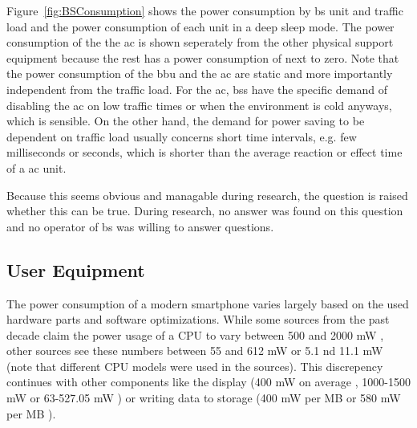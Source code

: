 \documentclass[11pt,a4paper]{article}
\begin{document}
Figure~\ref{fig:BSConsumption} shows the power consumption by \acrshort{bs} unit and traffic load and the power consumption of each unit in a deep sleep mode.
The power consumption of the the \acrshort{ac} is shown seperately from the other physical support equipment because the rest has a power consumption of next to zero.  
Note that the power consumption of the \acrshort*{bbu} and the \acrshort{ac} are static and more importantly independent from the traffic load.
For the \acrlong{ac}, \acrlong{bs}s have the specific demand of disabling the \acrshort{ac} on low traffic times or when the environment is cold anyways, which is sensible.
On the other hand, the demand for power saving to be dependent on traffic load usually concerns short time intervals, e.g. few milliseconds or seconds, which is shorter than the average reaction or effect time of a \acrlong{ac} unit.

Because this seems obvious and managable during research, the question is raised whether this can be true.
During research, no answer was found on this question and no operator of \acrshort{bs} was willing to answer questions.

\subsection{User Equipment}\label{subsec:UEConsumption}

The power consumption of a modern smartphone varies largely based on the used hardware parts and software optimizations.
While some sources from the past decade claim the power usage of a CPU to vary between 500 and 2000 mW \citep{smartphoneEnergyConsumption}, other sources see these numbers between 55 and 612 mW \citep{smartphoneEnergySurvey} or 5.1 nd 11.1 mW \citep{mobileEnergyConsumption} (note that different CPU models were used in the sources).
This discrepency continues with other components like the display (400 mW on average \citep{smartphoneEnergyConsumption}, 1000-1500 mW \citep{powerUsageSmartphonesQnovo} or 63-527.05 mW \citep{smartphoneEnergySurvey}) or writing data to storage (400 mW per MB \citep{powerUsageSmartphonesQnovo} or 580 mW per MB \citep{smartphoneEnergySurvey}).
\end{document}
